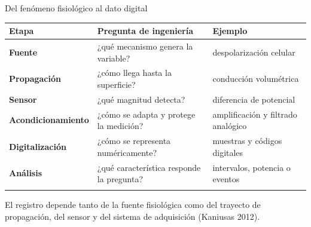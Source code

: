 \documentclass[
  ignorenonframetext,
  aspectratio=169,
  spanish,
  professionalfonts]{beamer}
\newcounter{none} %
\begin{document}
\begin{frame}[shrink]{Del fenómeno fisiológico al dato digital}
\protect{}\label{del-fenuxf3meno-fisioluxf3gico-al-dato-digital}
{\def\LTcaptype{none} %
\begin{longtable}[]{@{}
  >{\raggedright\arraybackslash}p{}
  >{\raggedright\arraybackslash}p{}
  >{\raggedright\arraybackslash}p{}@{}}
\toprule\noalign{}
\begin{minipage}[b]{\linewidth}\raggedright
Etapa
\end{minipage} & \begin{minipage}[b]{\linewidth}\raggedright
Pregunta de ingeniería
\end{minipage} & \begin{minipage}[b]{\linewidth}\raggedright
Ejemplo
\end{minipage} \\
\midrule\noalign{}
\endhead
\textbf{Fuente} & ¿qué mecanismo genera la variable? & despolarización
celular \\
\textbf{Propagación} & ¿cómo llega hasta la superficie? & conducción
volumétrica \\
\textbf{Sensor} & ¿qué magnitud detecta? & diferencia de potencial \\
\textbf{Acondicionamiento} & ¿cómo se adapta y protege la medición? &
amplificación y filtrado analógico \\
\textbf{Digitalización} & ¿cómo se representa numéricamente? & muestras
y códigos digitales \\
\textbf{Análisis} & ¿qué característica responde la pregunta? &
intervalos, potencia o eventos \\
\bottomrule\noalign{}
\end{longtable}
}

\begin{tcolorbox}[enhanced jigsaw, arc=.35mm, bottomrule=.15mm, bottomtitle=1mm, breakable, colback=white, colbacktitle=quarto-callout-note-color!10!white, colframe=quarto-callout-note-color-frame, coltitle=black, left=2mm, leftrule=.75mm, opacityback=0, opacitybacktitle=0.6, rightrule=.15mm, title={Modelo conceptual}, titlerule=0mm, toprule=.15mm, toptitle=1mm]

El registro depende tanto de la fuente fisiológica como del trayecto de
propagación, del sensor y del sistema de adquisición (Kaniusas 2012).

\end{tcolorbox}
\end{frame}
\end{document}
